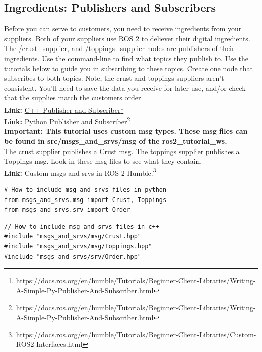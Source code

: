 \documentclass[11pt]{article}
\newcommand{\link}[2]{\textbf{Link: }\textcolor{blue}{\href{#2}{#1}}\footnote{#2}}
\begin{document}
\subsection{Ingredients: Publishers and Subscribers}
Before you can serve to customers, you need to receive ingredients from your suppliers. Both of your suppliers use ROS 2 to deliever their digital ingredients. The /crust\_supplier, and /toppings\_supplier nodes are publishers of their ingredients. Use the command-line to find what topics they publish to. Use the tutorials below to guide you in subscribing to these topics. Create one node that subscribes to both topics. Note, the crust and toppings suppliers aren't consistent. You'll need to save the data you receive for later use, and/or check that the supplies match the customers order.\\
\link{C++ Publisher and Subscriber}{https://docs.ros.org/en/humble/Tutorials/Beginner-Client-Libraries/Writing-A-Simple-Py-Publisher-And-Subscriber.html}\\
\link{Python Publisher and Subscriber}{https://docs.ros.org/en/humble/Tutorials/Beginner-Client-Libraries/Writing-A-Simple-Py-Publisher-And-Subscriber.html}\\
\textbf{Important: This tutorial uses custom msg types. These msg files can be found in src/msgs\_and\_srvs/msg of the ros2\_tutorial\_ws.}\\
The crust supplier publishes a Crust msg. The toppings supplier publishes a Toppings msg. Look in these msg files to see what they contain.\\
\link{Custom msgs and srvs in ROS 2 Humble.}{https://docs.ros.org/en/humble/Tutorials/Beginner-Client-Libraries/Custom-ROS2-Interfaces.html}

\lstset{language=python}
\begin{lstlisting}
# How to include msg and srvs files in python
from msgs_and_srvs.msg import Crust, Toppings
from msgs_and_srvs.srv import Order
\end{lstlisting}

\lstset{language=c++}
\begin{lstlisting}
// How to include msg and srvs files in c++
#include "msgs_and_srvs/msg/Crust.hpp"
#include "msgs_and_srvs/msg/Toppings.hpp"
#include "msgs_and_srvs/srv/Order.hpp"
\end{lstlisting}
\end{document}
